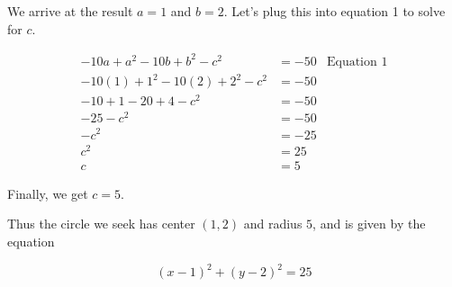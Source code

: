 We arrive at the result $a = 1$ and $b = 2$. Let's plug this into equation 1 to solve for $c$.

\begin{align*}
-10a + a^2 - 10b + b^2 - c^2 &= -50 & \text{Equation 1} \\
-10(1) + 1^2 - 10(2) + 2^2 - c^2 &= -50 \\
-10 + 1 - 20 + 4 - c^2 &= -50 \\
-25 - c^2 &= -50 \\
-c^2 &= -25 \\
c^2 &= 25 \\
c &= 5
\end{align*}

Finally, we get $c = 5$.

Thus the circle we seek has center $(1, 2)$ and radius $5$, and is given by the equation

$$ (x - 1)^2 + (y - 2)^2 = 25 $$
